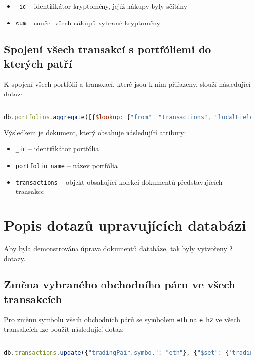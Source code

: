 \documentclass[12pt, a4paper]{article}
\let\oldsection\section
\renewcommand\section{\clearpage\oldsection}
\begin{document}
\begin{itemize}
    \item \texttt{_id} -- identifikátor kryptoměny, jejíž nákupy byly sčítány
    \item \texttt{sum} -- součet všech nákupů vybrané kryptoměny
\end{itemize}


\subsection{Spojení všech transakcí s portfóliemi do kterých patří}
K spojení všech portfólií a transkací, které jsou k nim přiřazeny, slouží následující dotaz:

\begin{lstlisting}[language=JavaScript]

db.portfolios.aggregate([{$lookup: {"from": "transactions", "localField": "_id", "foreignField": "portfolioId", "as": "transactions"}}, {$project: {"portfolio_name":"$name", "transactions":"$transactions"}}])

\end{lstlisting}
Výsledkem je dokument, který obsahuje následující atributy: 

\begin{itemize}
    \item \texttt{_id} -- identifikátor portfólia
    \item \texttt{portfolio_name} -- název portfólia
    \item \texttt{transactions} -- objekt obsahující kolekci dokumentů představujících transakce
\end{itemize}


\section{Popis dotazů upravujících databázi}
Aby byla demonstrována úprava dokumentů databáze, tak byly vytvořeny 2 dotazy.

\subsection{Změna vybraného obchodního páru ve všech transakcích}
Pro změnu symbolu všech obchodních párů se symbolem \texttt{eth} na \texttt{eth2} ve všech transakcích lze použít následující dotaz:

\begin{lstlisting}[language=JavaScript]

db.transactions.update({"tradingPair.symbol": "eth"}, {"$set": {"tradingPair.symbol":"eth2"}}, {"multi": true})

\end{lstlisting}
\end{document}
